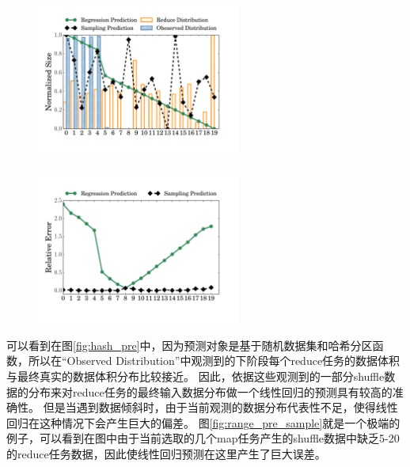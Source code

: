 \begin{figure}[!htp]
    \centering
	\includegraphics[width=0.6\textwidth]{../../PPoPP-2018/fig/range_pre_sample.pdf}
\end{figure}

\begin{figure}[!htp]
    \centering
	\includegraphics[width=0.6\textwidth]{../../PPoPP-2018/fig/prediction_relative_error.pdf}
\end{figure}

可以看到在图\ref{fig:hash_pre}中，因为预测对象是基于随机数据集和哈希分区函数，所以在“Observed Distribution”中观测到的下阶段每个reduce任务的数据体积与最终真实的数据体积分布比较接近。
因此，依据这些观测到的一部分shuffle数据的分布来对reduce任务的最终输入数据分布做一个线性回归的预测具有较高的准确性。
但是当遇到数据倾斜时，由于当前观测的数据分布代表性不足，使得线性回归在这种情况下会产生巨大的偏差。
图\ref{fig:range_pre_sample}就是一个极端的例子，可以看到在图中由于当前选取的几个map任务产生的shuffle数据中缺乏5-20的reduce任务数据，因此使线性回归预测在这里产生了巨大误差。

